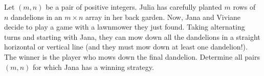 Let $(m, n)$ be a pair of positive integers.
Julia has carefully planted $m$ rows of $n$ dandelions in an $m \times n$ array in her back garden.
Now, Jana and Viviane decide to play a game with a lawnmower they just found.
Taking alternating turns and starting with Jana,
they can mow down all the dandelions in a straight horizontal or vertical line
(and they must mow down at least one dandelion!).
The winner is the player who mows down the final dandelion.
Determine all pairs $(m,n)$ for which Jana has a winning strategy.
